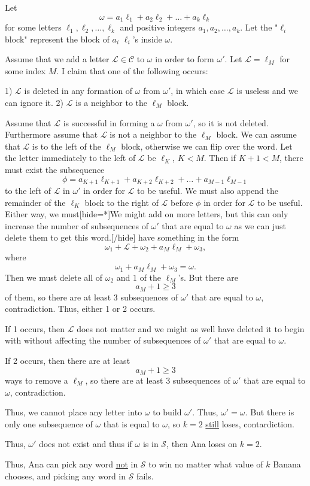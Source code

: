 Let \[\omega=a_1\ell_1+a_2\ell_2+\ldots+a_k\ell_k\] for some letters $\ell_1,\ell_2,\ldots,\ell_k$ and positive integers $a_1,a_2,\ldots,a_k$. Let the "$\ell_i$ block" represent the block of $a_i$ $\ell_i$'s inside $\omega$.

Assume that we add a letter $\mathcal{L}\in\mathcal{C}$ to $\omega$ in order to form $\omega'$. Let $\mathcal{L}=\ell_M$ for some index $M$. I claim that one of the following occurs:

1) $\mathcal{L}$ is deleted in any formation of $\omega$ from $\omega'$, in which case $\mathcal{L}$ is useless and we can ignore it.
2) $\mathcal{L}$ is a neighbor to the $\ell_M$ block.

Assume that $\mathcal{L}$ is successful in forming a $\omega$ from $\omega'$, so it is not deleted. Furthermore assume that $\mathcal{L}$ is not a neighbor to the $\ell_M$ block. We can assume that $\mathcal{L}$ is to the left of the $\ell_M$ block, otherwise we can flip over the word. Let the letter immediately to the left of $\mathcal{L}$ be $\ell_K$, $K<M$. Then if $K+1<M$, there must exist the subsequence \[\phi=a_{K+1}\ell_{K+1}+a_{K+2}\ell_{K+2}+\ldots+a_{M-1}\ell_{M-1}\] to the left of $\mathcal{L}$ in $\omega'$ in order for $\mathcal{L}$ to be useful. We must also append the remainder of the $\ell_K$ block to the right of $\mathcal{L}$ before $\phi$ in order for $\mathcal{L}$ to be useful. Either way, we must[hide=*]We might add on more letters, but this can only increase the number of subsequences of $\omega'$ that are equal to $\omega$ as we can just delete them to get this word.[/hide] have something in the form \[\omega_1+\mathcal{L}+\omega_2+a_M\ell_M+\omega_3,\] where \[\omega_1+a_M\ell_M+\omega_3=\omega.\] Then we must delete all of $\omega_2$ and $1$ of the $\ell_M$'s. But there are \[a_M+1\geq3\] of them, so there are at least $3$ subsequences of $\omega'$ that are equal to $\omega$, contradiction. Thus, either 1 or 2 occurs.

If 1 occurs, then $\mathcal{L}$ does not matter and we might as well have deleted it to begin with without affecting the number of subsequences of $\omega'$ that are equal to $\omega$.

If 2 occurs, then there are at least \[a_M+1\geq3\] ways to remove a $\ell_M$, so there are at least $3$ subsequences of $\omega'$ that are equal to $\omega$, contradiction.

Thus, we cannot place any letter into $\omega$ to build $\omega'$. Thus, $\omega'=\omega$. But there is only one subsequence of $\omega$ that is equal to $\omega$, so $k=2$ \underline{still} loses, contardiction.

Thus, $\omega'$ does not exist and thus if $\omega$ is in $\mathcal{S}$, then Ana loses on $k=2$.

Thus, Ana can pick any word \underline{not} in $\mathcal{S}$ to win no matter what value of $k$ Banana chooses, and picking any word in $\mathcal{S}$ fails.